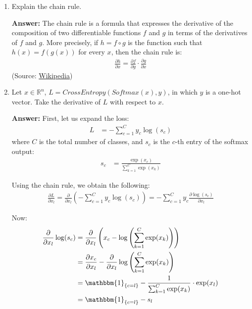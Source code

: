 \documentclass{article}
\newenvironment{QandA}{\begin{enumerate}[label=\arabic*.]}{\end{enumerate}}
\newenvironment{answer}{\par\normalfont \textbf{Answer:}}{}
\newcommand{\R}{\mathbb{R}}
\newcommand{\Indicator}[1]{\mathbbm{1}_{\left\{ #1 \right\}}}
\begin{document}
\begin{QandA}
    \item Explain the chain rule.
    \begin{answer}
        The chain rule is a formula that expresses the derivative of the composition of two differentiable functions $f$ and $g$ in terms of the derivatives of $f$ and $g$. More precisely, if $h = f \circ g$ is the function such that $h(x) = f(g(x))$ for every $x$, then the chain rule is:
        \begin{align*}
            \frac{\partial h}{\partial x} = \frac{\partial f}{\partial g} \cdot \frac{\partial g}{\partial x}
        \end{align*}
        (Source: \href{https://en.wikipedia.org/wiki/Chain_rule}{Wikipedia})
    \end{answer}
    
    \item Let $x \in \R^n$, $L = CrossEntropy(Softmax(x), y)$, in which $y$ is a one-hot vector. Take the derivative of $L$ with respect to $x$.
    \begin{answer}
        First, let us expand the loss:
        \begin{align*}
            L &= - \sum_{c=1}^C y_c \log (s_c)
        \end{align*}
        where $C$ is the total number of classes, and $s_c$ is the $c$-th entry of the softmax output:
        \begin{align*}
            s_c &= \frac{\exp(x_c)}{\sum_{k=1}^C \exp(x_k)} 
        \end{align*}

        Using the chain rule, we obtain the following:
        \begin{align*}
            \frac{\partial L}{\partial x_l} = \frac{\partial}{\partial x_l} \left( - \sum_{c=1}^C y_c \log (s_c) \right) = - \sum_{c=1}^C y_c  \frac{\partial \log (s_c)}{\partial x_l}
        \end{align*}

        Now:
        \begin{align*}
            \frac{\partial}{\partial x_l} \log(s_c) &= \frac{\partial}{\partial x_l} \left( x_c - \log \left( \sum_{k=1}^C \exp(x_k) \right) \right) \\
            &= \frac{\partial x_c}{\partial x_l} - \frac{\partial}{\partial x_l} \log \left( \sum_{k=1}^C \exp(x_k) \right) \\
            &= \Indicator{c = l} - \frac{1}{\sum_{k=1}^C \exp(x_k)} \cdot \exp(x_l) \\
            &= \Indicator{c = l} - s_l
        \end{align*}


\end{answer}
\end{QandA}
\end{document}
